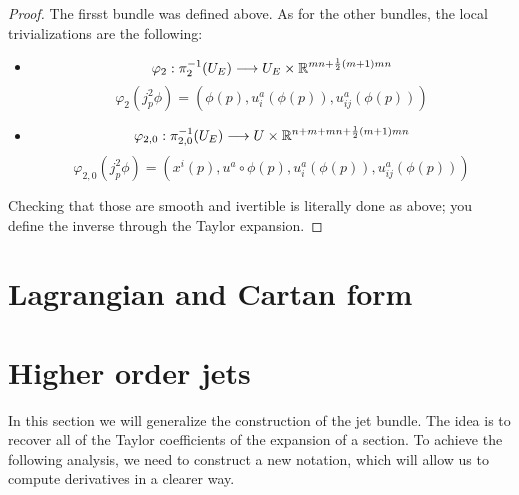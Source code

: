\documentclass[12pt,a4paper]{report}
\theoremstyle{definition}
\theoremstyle{Theorem}
\theoremstyle{definition}
\theoremstyle{definition}
\begin{document}
	\begin{proof}
		The firsst bundle was defined above. As for the other bundles, the local trivializations are the following: 
		\begin{itemize}
			\item $$\varphi_2:\pi_2^{-1}(U_E)\longrightarrow U_E\times \mathbb{R}^{mn+{1\over 2}(m+1)mn}$$
			$$\varphi_2(j^2_p\phi)=(\phi(p),u_i^a(\phi(p)),u_{ij}^a(\phi(p)))$$
			\item 
			$$\varphi_{2,0}:\pi_{2,0}^{-1}(U_E)\longrightarrow U\times \mathbb{R}^{n+m+mn+{1\over 2}(m+1)mn}$$
			$$\varphi_{2,0}(j^2_p\phi)=(x^i(p),u^a\circ \phi(p),u_i^a(\phi(p)),u_{ij}^a(\phi(p)))$$		
		\end{itemize}
		Checking that those are smooth and ivertible is literally done as above; you define the inverse through the Taylor expansion.
	\end{proof}
	\section{Lagrangian and Cartan form}
	\section{Higher order jets}
	In this section we will generalize the construction of the jet bundle. The idea is to recover all of the Taylor coefficients of the expansion of a section. To achieve the following analysis, we need to construct a new notation, which will allow us to compute derivatives in a clearer way.
\end{document}
